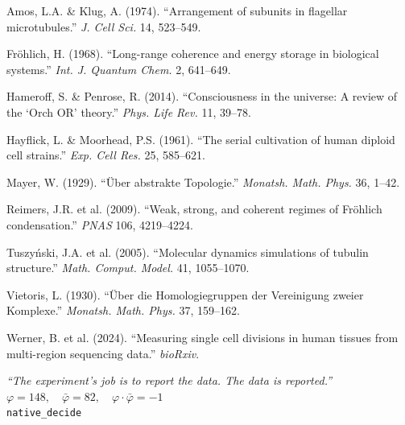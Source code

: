 \documentclass[12pt, letterpaper]{article}
\begin{document}
\begin{enumerate}[label={[\arabic*]}, nosep]
    \item Amos, L.A. \& Klug, A. (1974). ``Arrangement of subunits in flagellar microtubules.'' \textit{J. Cell Sci.} 14, 523--549.
    \item Fr\"{o}hlich, H. (1968). ``Long-range coherence and energy storage in biological systems.'' \textit{Int. J. Quantum Chem.} 2, 641--649.
    \item Hameroff, S. \& Penrose, R. (2014). ``Consciousness in the universe: A review of the `Orch OR' theory.'' \textit{Phys. Life Rev.} 11, 39--78.
    \item Hayflick, L. \& Moorhead, P.S. (1961). ``The serial cultivation of human diploid cell strains.'' \textit{Exp. Cell Res.} 25, 585--621.
    \item Mayer, W. (1929). ``\"{U}ber abstrakte Topologie.'' \textit{Monatsh. Math. Phys.} 36, 1--42.
    \item Reimers, J.R. et al. (2009). ``Weak, strong, and coherent regimes of Fr\"{o}hlich condensation.'' \textit{PNAS} 106, 4219--4224.
    \item Tuszy{\'n}ski, J.A. et al. (2005). ``Molecular dynamics simulations of tubulin structure.'' \textit{Math. Comput. Model.} 41, 1055--1070.
    \item Vietoris, L. (1930). ``\"{U}ber die Homologiegruppen der Vereinigung zweier Komplexe.'' \textit{Monatsh. Math. Phys.} 37, 159--162.
    \item Werner, B. et al. (2024). ``Measuring single cell divisions in human tissues from multi-region sequencing data.'' \textit{bioRxiv}.
\end{enumerate}

\vfill
\begin{center}
\small
\textit{``The experiment's job is to report the data. The data is reported.''}\\[0.5em]
$\varphi = 148, \quad \bar{\varphi} = 82, \quad \varphi \cdot \bar{\varphi} = -1$\\[0.3em]
\texttt{native\_decide}
\end{center}
\end{document}
